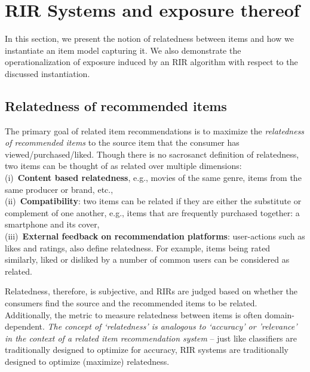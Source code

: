 \vspace{-1mm}
\section{RIR Systems and exposure thereof} \label{sec:fairness}

In this section, we present the notion of relatedness between items and how we instantiate an item model capturing it. We also demonstrate the operationalization of exposure induced by an RIR algorithm with respect to the discussed instantiation. %

\vspace{-1mm}
\subsection{Relatedness of recommended items}
The primary goal of related item recommendations is to maximize the {\it relatedness of recommended items} to the source item
that the consumer has viewed/purchased/liked. 
Though there is no sacrosanct definition of relatedness, two items can be thought of as related over multiple dimensions: \\
(i)~{\bf Content based relatedness}, e.g., movies of the same genre, items from the same producer or brand, etc., \\
(ii)~{\bf Compatibility}: two items can be related if they are either the substitute or complement of one another, e.g., items that are frequently purchased together: a smartphone and its cover, \\ %
(iii)~{\bf External feedback on recommendation platforms}: user-actions such as likes and ratings, also define relatedness. For example, items being rated similarly, liked or disliked by a number of common users can be considered as related. 

\noindent
Relatedness, therefore, is subjective, and RIRs are judged 
based on whether the consumers find the source and the recommended items to be related. Additionally, the metric to measure relatedness between items is often domain-dependent.
{\it The concept of `relatedness' is analogous to `accuracy' or 'relevance' in the context of a related item recommendation system} -- just like classifiers are traditionally designed to optimize for accuracy, RIR systems are traditionally designed to optimize (maximize) relatedness.

